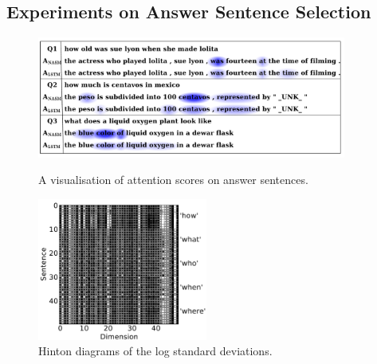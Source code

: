 \documentclass{article}
\begin{document}
\subsection{Experiments on Answer Sentence Selection}
\label{result}
\begin{figure}[!htb]
\begin{minipage}[t]{0.53\linewidth}
  \centering
	\includegraphics[width=4.0in]{4_att.pdf}
	\caption{A visualisation of attention scores on answer sentences.}
	\label{fig:att}
\end{minipage}
\hfill
\begin{minipage}[t]{0.5\linewidth}
  \centering
	\includegraphics[width=2.2in]{9_logsigm.pdf}
	\caption{Hinton diagrams of the log standard deviations.}
	\label{fig:hinton}
\end{minipage}
\end{figure}
\end{document}
